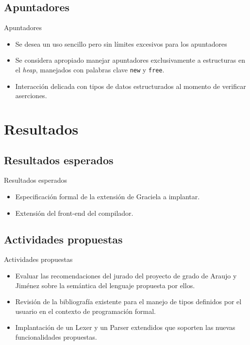 \documentclass{beamer}
\begin{document}
\subsection{Apuntadores}
\begin{frame}{Apuntadores}
\begin{itemize}
  \item Se desea un uso sencillo pero sin límites excesivos para los apuntadores
  \item Se considera apropiado manejar apuntadores exclusivamente a estructuras en el \textit{heap},
    manejados con palabras clave \texttt{new} y \texttt{free}.
  \item Interacción delicada con tipos de datos estructurados al momento de verificar aserciones.
\end{itemize}
\end{frame}


\section{Resultados}

\subsection{Resultados esperados}
\begin{frame}{Resultados esperados}
\begin{itemize}
  \item Especificación formal de la extensión de Graciela a implantar.
  \item Extensión del front-end del compilador.
\end{itemize}

\end{frame}

\subsection{Actividades propuestas}
\begin{frame}{Actividades propuestas}
\begin{itemize}
  \item Evaluar las recomendaciones del jurado del proyecto de grado de Araujo y
Jiménez sobre la semántica del lenguaje propuesta por ellos.
  \item Revisión de la bibliografía existente para el manejo de tipos definidos
por el usuario en el contexto de programación formal.
  \item Implantación de un Lexer y un Parser extendidos que soporten las nuevas
funcionalidades propuestas.
\end{itemize}

\end{frame}
\end{document}
